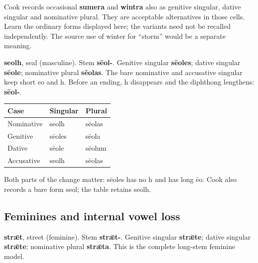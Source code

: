 Cook records occasional \textbf{sumera} and \textbf{wintra} also as genitive singular, dative singular and nominative plural. They are acceptable alternatives in those cells. Learn the ordinary forms displayed here; the variants need not be recalled independently. The source use of winter for “storm” would be a separate meaning.

\textbf{seolh}, seal (masculine). Stem \textbf{sēol-}. Genitive singular \textbf{sēoles}; dative singular \textbf{sēole}; nominative plural \textbf{sēolas}. The bare nominative and accusative singular keep short eo and h. Before an ending, h disappears and the diphthong lengthens: \textbf{sēol-}.

\par\begingroup
\fontsize{10.5}{13.2}\selectfont
\setlength{\LTleft}{0pt}\setlength{\LTright}{\fill}
\noindent
\begin{tabular}{@{}>{\raggedright\arraybackslash}p{39.46mm}>{\raggedright\arraybackslash}p{39.46mm}>{\raggedright\arraybackslash}p{39.46mm}@{}}
\toprule
\textbf{Case} & \textbf{Singular} & \textbf{Plural} \\
\midrule
Nominative & seolh & sēolas \\
Genitive & sēoles & sēola \\
Dative & sēole & sēolum \\
Accusative & seolh & sēolas \\
\bottomrule
\end{tabular}
\par\endgroup

Both parts of the change matter: sēoles has no h and has long ēo. Cook also records a bare form seol; the table retains seolh.

\subsection*{Feminines and internal vowel loss}

\textbf{strǣt}, street (feminine). Stem \textbf{strǣt-}. Genitive singular \textbf{strǣte}; dative singular \textbf{strǣte}; nominative plural \textbf{strǣta}. This is the complete long-stem feminine model.

